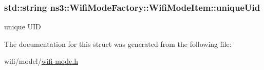 \subsubsection[{\texorpdfstring{unique\+Uid}{uniqueUid}}]{\setlength{\rightskip}{0pt plus 5cm}std\+::string ns3\+::\+Wifi\+Mode\+Factory\+::\+Wifi\+Mode\+Item\+::unique\+Uid}\hypertarget{structns3_1_1WifiModeFactory_1_1WifiModeItem_a5aa9c918544ecb7514e0e7d0f9721c5e}{}\label{structns3_1_1WifiModeFactory_1_1WifiModeItem_a5aa9c918544ecb7514e0e7d0f9721c5e}


unique U\+ID 



The documentation for this struct was generated from the following file\+:\begin{DoxyCompactItemize}
\item 
wifi/model/\hyperlink{wifi-mode_8h}{wifi-\/mode.\+h}\end{DoxyCompactItemize}
